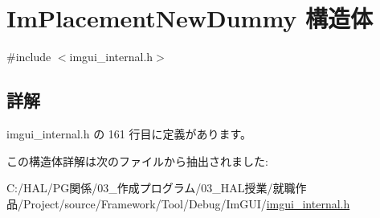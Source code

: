 \hypertarget{struct_im_placement_new_dummy}{}\section{Im\+Placement\+New\+Dummy 構造体}
\label{struct_im_placement_new_dummy}


{\ttfamily \#include $<$imgui\+\_\+internal.\+h$>$}



\subsection{詳解}


 imgui\+\_\+internal.\+h の 161 行目に定義があります。



この構造体詳解は次のファイルから抽出されました\+:\begin{DoxyCompactItemize}
\item 
C\+:/\+H\+A\+L/\+P\+G関係/03\+\_\+作成プログラム/03\+\_\+\+H\+A\+L授業/就職作品/\+Project/source/\+Framework/\+Tool/\+Debug/\+Im\+G\+U\+I/\mbox{\hyperlink{imgui__internal_8h}{imgui\+\_\+internal.\+h}}\end{DoxyCompactItemize}
